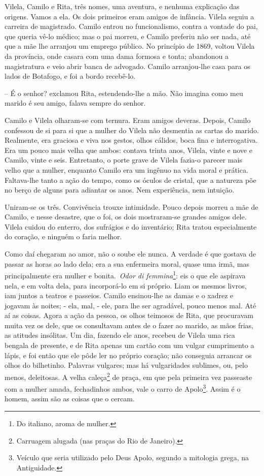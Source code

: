 Vilela, Camilo e Rita, três nomes, uma aventura, e nenhuma explicação
das origens. Vamos a ela. Os dois primeiros eram amigos de infância.
Vilela seguiu a carreira de magistrado. Camilo entrou no funcionalismo,
contra a vontade do pai, que queria vê-lo médico; mas o pai morreu, e
Camilo preferiu não ser nada, até que a mãe lhe arranjou um emprego
público. No princípio de 1869, voltou Vilela da província, onde casara
com uma dama formosa e tonta; abandonou a magistratura e veio abrir
banca de advogado. Camilo arranjou-lhe casa para os lados de Botafogo, e
foi a bordo recebê-lo.

-- É o senhor? exclamou Rita, estendendo-lhe a mão. Não imagina como meu
marido é seu amigo, falava sempre do senhor.

Camilo e Vilela olharam-se com ternura. Eram amigos deveras. Depois,
Camilo confessou de si para si que a mulher do Vilela não desmentia as
cartas do marido. Realmente, era graciosa e viva nos gestos, olhos
cálidos, boca fina e interrogativa. Era um pouco mais velha que ambos:
contava trinta anos, Vilela, vinte e nove e Camilo, vinte e seis.
Entretanto, o porte grave de Vilela fazia-o parecer mais velho que a
mulher, enquanto Camilo era um ingênuo na vida moral e prática.
Faltava-lhe tanto a ação do tempo, como os óculos de cristal, que a
natureza põe no berço de alguns para adiantar os anos. Nem experiência,
nem intuição.

Uniram-se os três. Convivência trouxe intimidade. Pouco depois morreu a
mãe de Camilo, e nesse desastre, que o foi, os dois mostraram-se grandes
amigos dele. Vilela cuidou do enterro, dos sufrágios e do inventário;
Rita tratou especialmente do coração, e ninguém o faria melhor.

Como daí chegaram ao amor, não o soube ele nunca. A verdade é que
gostava de passar as horas ao lado dela; era a sua enfermeira moral,
quase uma irmã, mas principalmente era mulher e bonita.~\emph{Odor di
femmina}\footnote{Do italiano, aroma de mulher.}: eis o que ele aspirava
nela, e em volta dela, para incorporá-lo em si próprio. Liam os mesmos
livros, iam juntos a teatros e passeios. Camilo ensinou-lhe as damas e o
xadrez e jogavam às noites; - ela, mal, - ele, para lhe ser agradável,
pouco menos mal. Até aí as coisas. Agora a ação da pessoa, os olhos
teimosos de Rita, que procuravam muita vez os dele, que os consultavam
antes de o fazer ao marido, as mãos frias, as atitudes insólitas. Um
dia, fazendo ele anos, recebeu de Vilela uma rica bengala de presente, e
de Rita apenas um cartão com um vulgar cumprimento a lápis, e foi então
que ele pôde ler no próprio coração; não conseguia arrancar os olhos do
bilhetinho. Palavras vulgares; mas há vulgaridades sublimes, ou, pelo
menos, deleitosas. A velha caleça\footnote{Carruagem alugada (nas praças
  do Rio de Janeiro).} de praça, em que pela primeira vez passeaste com
a mulher amada, fechadinhos ambos, vale o carro de Apolo\footnote{Veículo
  que seria utilizado pelo Deus Apolo, segundo a mitologia grega, na
  Antiguidade.}. Assim é o homem, assim são as coisas que o cercam.

